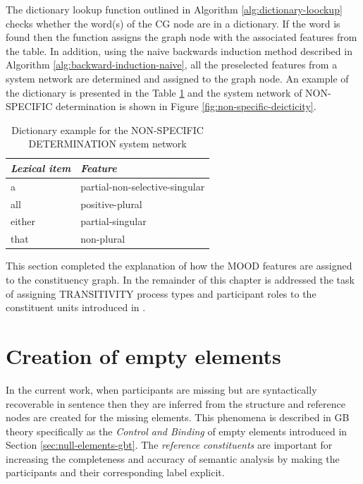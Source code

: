     The dictionary lookup function outlined in Algorithm \ref{alg:dictionary-loockup} checks whether the word(s) of the CG node are in a dictionary. If the word is found then the function assigns the graph node with the associated features from the table. In addition, using the naive backwards induction method described in Algorithm \ref{alg:backward-induction-naive}, all the preselected features from a system network are determined and assigned to the graph node. %
    An example of the dictionary is presented in the Table \ref{tab:lookup-dict-example} and the system network of NON-SPECIFIC determination is shown in Figure \ref{fig:non-specific-deicticity}.

\begin{table}[!ht]
    \centering
    \begin{tabular}{|l|l|}
        \hline
        \textit{Lexical item} & \textit{Feature}               \\ \hline
        a                     & partial-non-selective-singular \\ \hline
        all                   & positive-plural                \\ \hline
        either                & partial-singular               \\ \hline
        that                  & non-plural                     \\ \hline
    \end{tabular}
    \caption{Dictionary example for the NON-SPECIFIC DETERMINATION system network}
    \label{tab:lookup-dict-example}
\end{table}

    This section completed the explanation of how the MOOD features are assigned to the constituency graph. In the remainder of this chapter is addressed the task of assigning TRANSITIVITY process types and participant roles to the constituent units introduced in \citet{Costetchi2013}.

\section{Creation of empty elements}
\label{sec:creation-empty-elements}

    In the current work, when participants are missing but are syntactically recoverable in sentence then they are inferred from the structure and reference nodes are created for the missing elements. This phenomena is described in GB theory specifically as the \textit{Control and Binding} of empty elements \citep{Haegeman1991} introduced in Section \ref{sec:null-elements-gbt}. The \textit{reference constituents} are important for increasing the completeness and accuracy of semantic analysis by making the participants and their corresponding label explicit.

